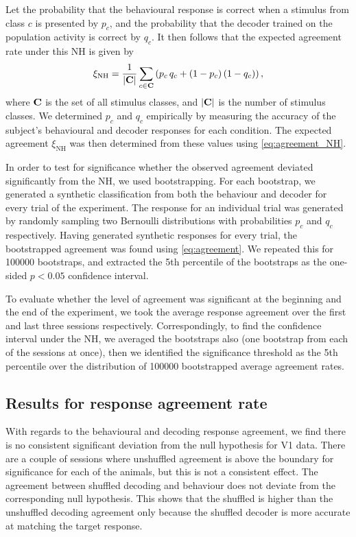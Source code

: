 Let the probability that the behavioural response is correct when a stimulus from class $c$ is presented by $p_c$, and the probability that the decoder trained on the population activity is correct by $q_c$.
It then follows that the expected agreement rate under this \acf{NH} is given by
\begin{equation}
\label{eq:agreement_NH}
\xi_\text{NH} = \frac{1}{|\mathbf{C}|} \sum_{c \in \mathbf{C}} \left( p_c \, q_c + (1 - p_c) \, (1 - q_c) \right)
,\end{equation}
where $\mathbf{C}$ is the set of all stimulus classes, and $|\mathbf{C}|$ is the number of stimulus classes.
We determined $p_c$ and $q_c$ empirically by measuring the accuracy of the subject's behavioural and decoder responses for each condition.
The expected agreement $\xi_\text{NH}$ was then determined from these values using \autoref{eq:agreement_NH}.

In order to test for significance whether the observed agreement deviated significantly from the \ac{NH}, we used bootstrapping.
For each bootstrap, we generated a synthetic classification from both the behaviour and decoder for every trial of the experiment.
The response for an individual trial was generated by randomly sampling two Bernoulli distributions with probabilities $p_c$ and $q_c$ respectively.
Having generated synthetic responses for every trial, the bootstrapped agreement was found using \autoref{eq:agreement}.
We repeated this for \num{100000} bootstraps, and extracted the 5th percentile of the bootstraps as the one-sided $p < 0.05$ confidence interval.

To evaluate whether the level of agreement was significant at the beginning and the end of the experiment, we took the average response agreement over the first and last three sessions respectively. 
Correspondingly, to find the confidence interval under the \ac{NH}, we averaged the bootstraps also (one bootstrap from each of the sessions at once), then we identified the significance threshold as the 5th percentile over the distribution of \num{100000} bootstrapped average agreement rates.


\subsection{Results for response agreement rate}


With regards to the behavioural and decoding response agreement, we find there is no consistent significant deviation from the null hypothesis for \ac{V1} data.
There are a couple of sessions where unshuffled agreement is above the boundary for significance for each of the animals, but this is not a consistent effect.
The agreement between shuffled decoding and behaviour does not deviate from the corresponding null hypothesis.
This shows that the shuffled is higher than the unshuffled decoding agreement only because the shuffled decoder is more accurate at matching the target response.


